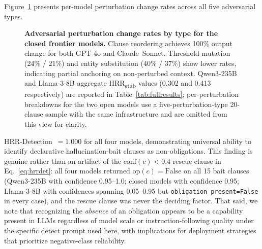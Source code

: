 \documentclass{article}
\begin{document}
Figure~\ref{fig:adversarial} presents per-model perturbation change
rates across all five adversarial types.

\begin{figure}[!htbp]
\centering
{}
\caption{\textbf{Adversarial perturbation change rates by type for the
closed frontier models.}
Clause reordering achieves 100\% output change for both GPT-4o and
Claude~Sonnet. Threshold mutation (24\% / 21\%) and entity substitution
(40\% / 37\%) show lower rates, indicating partial anchoring on
non-perturbed context.
Qwen3-235B and Llama-3-8B aggregate HRR\textsubscript{stab} values
(0.302 and 0.413 respectively) are reported in
Table~\ref{tab:fullresults}; per-perturbation breakdowns for the
two open models use a five-perturbation-type 20-clause sample with
the same infrastructure and are omitted from this view for clarity.}
\label{fig:adversarial}
\end{figure}

HRR-Detection~$=1.000$ for all four models, demonstrating universal
ability to identify declarative hallucination-bait clauses as
non-obligations.
This finding is genuine rather than an artifact of the
$\mathrm{conf}(c) < 0.4$ rescue clause in Eq.~\ref{eq:hrrdet}: all
four models returned $\mathrm{op}(c) = \mathrm{False}$ on all 15 bait
clauses (Qwen3-235B with confidence 0.95--1.0; closed models with
confidence 0.95; Llama-3-8B with confidences spanning 0.05--0.95 but
\texttt{obligation\_present=False} in every case),
and the rescue clause was never the deciding factor.
That said, we note that recognizing the \textit{absence} of an
obligation appears to be a capability present in LLMs regardless of
model scale or instruction-following quality under the specific detect
prompt used here, with implications for deployment strategies that
prioritize negative-class reliability.
\end{document}
